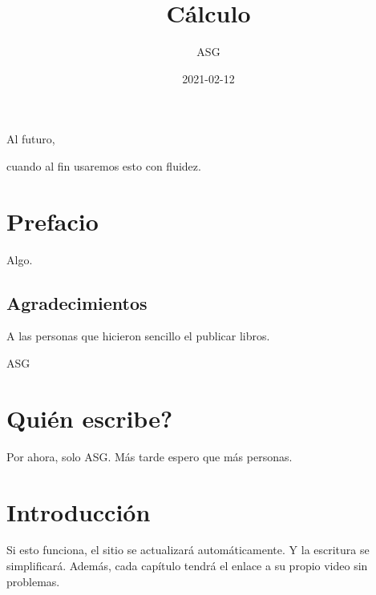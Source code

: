 \documentclass[
]{krantz}
\title{Cálculo}
\author{ASG}
\date{2021-02-12}
\theoremstyle{definition}
\theoremstyle{definition}
\theoremstyle{definition}
\theoremstyle{definition}
\theoremstyle{remark}
\begin{document}
\maketitle


\thispagestyle{empty}

\begin{center}
Al futuro,

cuando al fin usaremos esto con fluidez.
\end{center}

\setlength{\abovedisplayskip}{-5pt}
\setlength{\abovedisplayshortskip}{-5pt}

{
\hypersetup{linkcolor=}
\setcounter{tocdepth}{2}
\tableofcontents
}
\listoftables
\listoffigures
\hypertarget{prefacio}{%
\chapter*{Prefacio}\label{prefacio}}


Algo.

\hypertarget{agradecimientos}{%
\section*{Agradecimientos}\label{agradecimientos}}


A las personas que hicieron sencillo el publicar libros.

\begin{flushright}
ASG
\end{flushright}

\hypertarget{quiuxe9n-escribe}{%
\chapter{Quién escribe?}\label{quiuxe9n-escribe}}

Por ahora, solo ASG. Más tarde espero que más personas.

\mainmatter

\hypertarget{introducciuxf3n}{%
\chapter{Introducción}\label{introducciuxf3n}}

Si esto funciona, el sitio se actualizará automáticamente. Y la escritura se simplificará. Además, cada capítulo tendrá el enlace a su propio video sin problemas.
\end{document}
